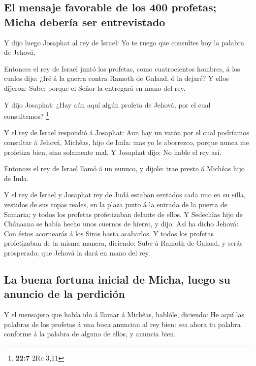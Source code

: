 \hypertarget{el-mensaje-favorable-de-los-400-profetas-micha-deberuxeda-ser-entrevistado}{%
\subsection{El mensaje favorable de los 400 profetas; Micha debería ser
entrevistado}\label{el-mensaje-favorable-de-los-400-profetas-micha-deberuxeda-ser-entrevistado}}

 Y dijo luego Josaphat al rey de Israel: Yo te ruego que
consultes hoy la palabra de Jehová.

 Entonces el rey de Israel juntó los profetas, como
cuatrocientos hombres, á los cuales dijo: ¿Iré á la guerra contra Ramoth
de Galaad, ó la dejaré? Y ellos dijeron: Sube; porque el Señor la
entregará en mano del rey.

 Y dijo Josaphat: ¿Hay aún aquí algún profeta de Jehová, por
el cual consultemos? \footnote{\textbf{22:7} 2Re 3,11}

 Y el rey de Israel respondió á Josaphat: Aun hay un varón
por el cual podríamos consultar á Jehová, Michêas, hijo de Imla: mas yo
le aborrezco, porque nunca me profetiza bien, sino solamente mal. Y
Josaphat dijo: No hable el rey así.

 Entonces el rey de Israel llamó á un eunuco, y díjole: trae
presto á Michêas hijo de Imla.

 Y el rey de Israel y Josaphat rey de Judá estaban sentados
cada uno en su silla, vestidos de sus ropas reales, en la plaza junto á
la entrada de la puerta de Samaria; y todos los profetas profetizaban
delante de ellos.  Y Sedechîas hijo de Chânaana se había
hecho unos cuernos de hierro, y dijo: Así ha dicho Jehová: Con éstos
acornearás á los Siros hasta acabarlos.  Y todos los
profetas profetizaban de la misma manera, diciendo: Sube á Ramoth de
Galaad, y serás prosperado; que Jehová la dará en mano del rey.

\hypertarget{la-buena-fortuna-inicial-de-micha-luego-su-anuncio-de-la-perdiciuxf3n}{%
\subsection{La buena fortuna inicial de Micha, luego su anuncio de la
perdición}\label{la-buena-fortuna-inicial-de-micha-luego-su-anuncio-de-la-perdiciuxf3n}}

 Y el mensajero que había ido á llamar á Michêas, hablóle,
diciendo: He aquí las palabras de los profetas á una boca anuncian al
rey bien: sea ahora tu palabra conforme á la palabra de alguno de ellos,
y anuncia bien.


